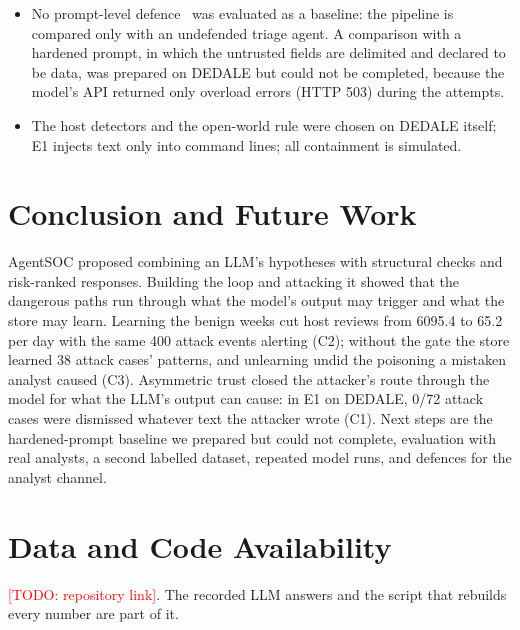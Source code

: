 \documentclass[conference]{IEEEtran}
\newcommand{\todo}[1]{\textcolor{red}{[TODO: #1]}}
\begin{document}
\begin{itemize}
a new decision, so evidence that arrives later in a case is not reasoned about until a new case opens.
\item No prompt-level defence~\cite{spotlighting,struq} was evaluated as a baseline: the pipeline is compared only
with an undefended triage agent. A comparison with a hardened prompt, in which the untrusted fields are delimited
and declared to be data, was prepared on DEDALE but could not be completed, because the model's API returned only
overload errors (HTTP 503) during the attempts.
\item The host detectors and the open-world rule were chosen on DEDALE itself; E1 injects text only into command
lines; all containment is simulated.
\end{itemize}

\section{Conclusion and Future Work}
AgentSOC proposed combining an LLM's hypotheses with structural checks and risk-ranked responses. Building the
loop and attacking it showed that the dangerous paths run through what the model's output may trigger and what the
store may learn. Learning the benign weeks cut host reviews from 6095.4 to 65.2 per day with the same 400 attack
events alerting (C2); without the gate the store learned 38 attack cases' patterns, and unlearning undid the poisoning a
mistaken analyst caused (C3). Asymmetric trust closed the attacker's route through the model for what the LLM's
output can cause: in E1 on DEDALE, 0/72 attack cases were dismissed whatever text the attacker wrote (C1). Next
steps are the hardened-prompt baseline we prepared but could not complete, evaluation with real analysts, a second
labelled dataset, repeated model runs, and defences for the analyst channel.

\section*{Data and Code Availability}
\todo{repository link}. The recorded LLM answers and the script that rebuilds every number are part of it.
\end{document}
